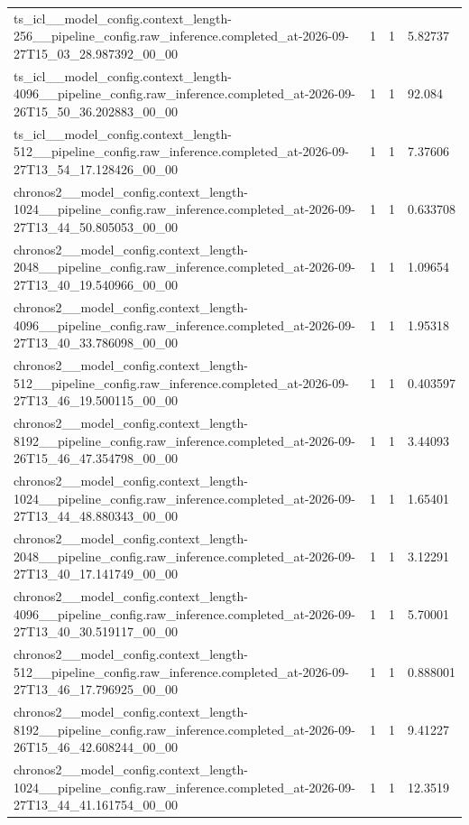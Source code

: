 \begin{tabular}{llll}
ts\_icl\_\_model\_config.context\_length-256\_\_pipeline\_config.raw\_inference.completed\_at-2026-09-27T15\_03\_28.987392\_00\_00 & 1 & 1 & 5.82737 \\
ts\_icl\_\_model\_config.context\_length-4096\_\_pipeline\_config.raw\_inference.completed\_at-2026-09-26T15\_50\_36.202883\_00\_00 & 1 & 1 & 92.084 \\
ts\_icl\_\_model\_config.context\_length-512\_\_pipeline\_config.raw\_inference.completed\_at-2026-09-27T13\_54\_17.128426\_00\_00 & 1 & 1 & 7.37606 \\
chronos2\_\_model\_config.context\_length-1024\_\_pipeline\_config.raw\_inference.completed\_at-2026-09-27T13\_44\_50.805053\_00\_00 & 1 & 1 & 0.633708 \\
chronos2\_\_model\_config.context\_length-2048\_\_pipeline\_config.raw\_inference.completed\_at-2026-09-27T13\_40\_19.540966\_00\_00 & 1 & 1 & 1.09654 \\
chronos2\_\_model\_config.context\_length-4096\_\_pipeline\_config.raw\_inference.completed\_at-2026-09-27T13\_40\_33.786098\_00\_00 & 1 & 1 & 1.95318 \\
chronos2\_\_model\_config.context\_length-512\_\_pipeline\_config.raw\_inference.completed\_at-2026-09-27T13\_46\_19.500115\_00\_00 & 1 & 1 & 0.403597 \\
chronos2\_\_model\_config.context\_length-8192\_\_pipeline\_config.raw\_inference.completed\_at-2026-09-26T15\_46\_47.354798\_00\_00 & 1 & 1 & 3.44093 \\
chronos2\_\_model\_config.context\_length-1024\_\_pipeline\_config.raw\_inference.completed\_at-2026-09-27T13\_44\_48.880343\_00\_00 & 1 & 1 & 1.65401 \\
chronos2\_\_model\_config.context\_length-2048\_\_pipeline\_config.raw\_inference.completed\_at-2026-09-27T13\_40\_17.141749\_00\_00 & 1 & 1 & 3.12291 \\
chronos2\_\_model\_config.context\_length-4096\_\_pipeline\_config.raw\_inference.completed\_at-2026-09-27T13\_40\_30.519117\_00\_00 & 1 & 1 & 5.70001 \\
chronos2\_\_model\_config.context\_length-512\_\_pipeline\_config.raw\_inference.completed\_at-2026-09-27T13\_46\_17.796925\_00\_00 & 1 & 1 & 0.888001 \\
chronos2\_\_model\_config.context\_length-8192\_\_pipeline\_config.raw\_inference.completed\_at-2026-09-26T15\_46\_42.608244\_00\_00 & 1 & 1 & 9.41227 \\
chronos2\_\_model\_config.context\_length-1024\_\_pipeline\_config.raw\_inference.completed\_at-2026-09-27T13\_44\_41.161754\_00\_00 & 1 & 1 & 12.3519 \\

\end{tabular}
